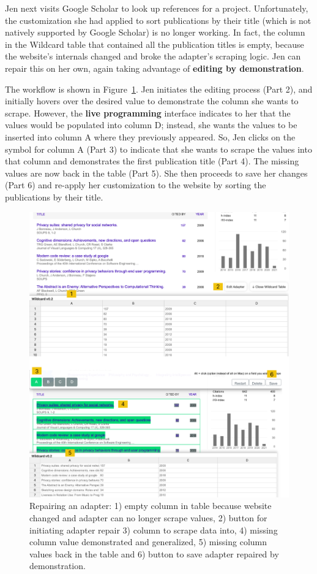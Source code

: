 \documentclass[sigconf,10pt]{acmart}
\begin{document}
Jen next visits Google Scholar to look up references for a project.
Unfortunately, the customization she had applied to sort publications by
their title (which is not natively supported by Google Scholar) is no
longer working. In fact, the column in the Wildcard table that contained
all the publication titles is empty, because the website's internals
changed and broke the adapter's scraping logic. Jen can repair this on
her own, again taking advantage of \textbf{editing by demonstration}.

The workflow is shown in Figure~\ref{fig:repairing}. Jen initiates the
editing process (Part 2), and initially hovers over the desired value to
demonstrate the column she wants to scrape. However, the \textbf{live
programming} interface indicates to her that the values would be
populated into column D; instead, she wants the values to be inserted
into column A where they previously appeared. So, Jen clicks on the
symbol for column A (Part 3) to indicate that she wants to scrape the
values into that column and demonstrates the first publication title
(Part 4). The missing values are now back in the table (Part 5). She
then proceeds to save her changes (Part 6) and re-apply her
customization to the website by sorting the publications by their title.

\begin{figure}
  \includegraphics[width=\textwidth]{media/repairing.png}
  \caption{\label{fig:repairing} Repairing an adapter: 1) empty column in table because website changed and adapter can no longer scrape values, 2) button for initiating adapter repair 3) column to scrape data into, 4) missing column value demonstrated and generalized, 5) missing column values back in the table and 6) button to save adapter repaired by demonstration.}
\end{figure}
\end{document}
